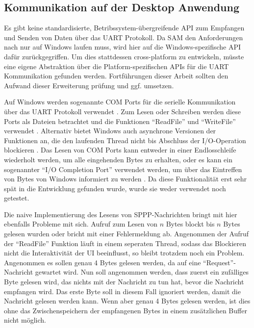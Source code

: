 \subsection{Kommunikation auf der Desktop Anwendung} \label{umsetzungSW-Kommunikation-UI}

Es gibt keine standardisierte, Betribssystem-übergreifende API zum Empfangen und Senden von Daten über das \ac{UART} Protokoll.
Da \ac{SAM} den Anforderungen nach nur auf Windows laufen muss, wird hier auf die Windows-spezifische API dafür zurückgegriffen.
Um dies stattdessen cross-platform zu entwickeln, müsste eine eigene Abstraktion über die Platform-spezifischen APIs für die \ac{UART} Kommunikation gefunden werden.
Fortführungen dieser Arbeit sollten den Aufwand dieser Erweiterung prüfung und ggf. umsetzen.

Auf Windows werden sogenannte COM Ports für die serielle Kommunikation über das \ac{UART} Protokoll verwendet \cite[vgl.][]{mar.ConfigurationCOMPorts.22}.
Zum Lesen oder Schreiben werden diese Ports als Dateien betrachtet und die Funktionen \enquote{ReadFile} und \enquote{WriteFile} verwendet \cites[vgl.][Kapitel 4]{den.SerialCommunications.10}[][S. 3]{bay.WindowsSerialPort.08}.
Alternativ bietet Windows auch asynchrone Versionen der Funktionen an, die den laufenden Thread nicht bis Abschluss der \ac{I/O}-Operation blockieren \cite[vgl.][Kapitel 4]{den.SerialCommunications.10}. \newline
Das Lesen von COM Ports kann entweder in einer Endlosschleife wiederholt werden, um alle eingehenden Bytes zu erhalten, oder es kann ein sogenannter \enquote{\ac{I/O} Completion Port} verwendet werden, um über das Eintreffen von Bytes von Windows informiert zu werden \cite[vgl.][]{ash.CompletionPortsWin32.22}.
Da diese Funktionalität erst sehr spät in die Entwicklung gefunden wurde, wurde sie weder verwendet noch getestet.

Die naive Implementierung des Lesens von \ac{SPPP}-Nachrichten bringt mit hier ebenfalls Probleme mit sich.
Aufruf zum Lesen von $n$ Bytes blockt bis $n$ Bytes gelesen wurden oder bricht mit einer Fehlermeldung ab.
Angenommen der Aufruf der \enquote{ReadFile} Funktion läuft in einem seperaten Thread, sodass das Blockieren nicht die Interaktivität der \ac{UI} beeinflusst, so bleibt trotzdem noch ein Problem.
Angenommen es sollen genau 4 Bytes gelesen werden, da auf eine \enquote{Request}-Nachricht gewartet wird.
Nun soll angenommen werden, dass zuerst ein zufälliges Byte gelesen wird, das nichts mit der Nachricht zu tun hat, bevor die Nachricht empfangen wird.
Das erste Byte soll in diesem Fall ignoriert werden, damit die Nachricht gelesen werden kann.
Wenn aber genau 4 Bytes gelesen werden, ist dies ohne das Zwischenspeichern der empfangenen Bytes in einem zusätzlichen Buffer nicht möglich.

